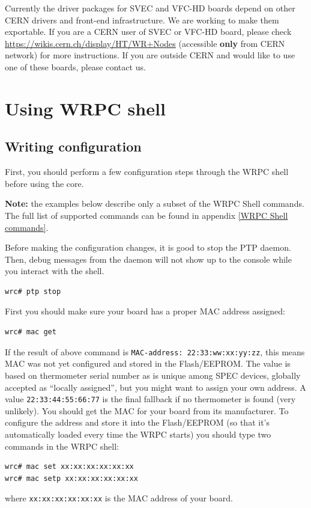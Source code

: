 \documentclass[a4paper, 12pt]{article}
\newcommand{\codeHook}[1]{\mbox{\ttfamily\MakeTextUppercase{#1}}}
\begin{document}
Currently the driver packages for SVEC and VFC-HD boards depend on other CERN
drivers and front-end infrastructure. We are working to make them exportable. If
you are a CERN user of SVEC or VFC-HD board, please check
\url{https://wikis.cern.ch/display/HT/WR+Nodes} (accessible \textbf{only} from
CERN network) for more instructions. If you are outside CERN and would like to
use one of these boards, please contact us.

\section{Using WRPC shell}

\subsection{Writing configuration}
\label{Writing configuration}

First, you should perform a few configuration steps through the \codeHook{wrpc} shell
before using the core.

\noindent\textbf{Note:} the examples below describe only a subset of the \codeHook{wrpc} Shell
commands. The full list of supported commands can be found in appendix
\ref{WRPC Shell commands}.

\vspace{1em}
Before making the configuration changes, it is good to stop the \codeHook{ptp} daemon.
Then, debug messages from the daemon will not show up to the console while you
interact with the shell.

\begin{lstlisting}
wrc# ptp stop
\end{lstlisting}

\vspace{1em}
First you should make sure your board has a proper \codeHook{mac} address assigned:
\begin{lstlisting}
wrc# mac get
\end{lstlisting}
If the result of above command is \texttt{MAC-address: 22:33:ww:xx:yy:zz}, this means
\codeHook{mac} was not yet configured and stored in the Flash/EEPROM. The value is
based on thermometer serial number as is unique among SPEC devices,
globally accepted as ``locally assigned'', but you might want to assign your own address. A value \texttt{22:33:44:55:66:77} is the final fallback if no
thermometer is found (very unlikely). You should get
the \codeHook{mac} for your board from its manufacturer. To configure the address and
store it into the Flash/EEPROM (so that it's automatically loaded every time the
\codeHook{wrpc} starts) you should type two commands in the \codeHook{wrpc} shell:
\begin{lstlisting}
wrc# mac set xx:xx:xx:xx:xx:xx
wrc# mac setp xx:xx:xx:xx:xx:xx
\end{lstlisting}
where \texttt{xx:xx:xx:xx:xx:xx} is the \codeHook{mac} address of your board.
\end{document}
